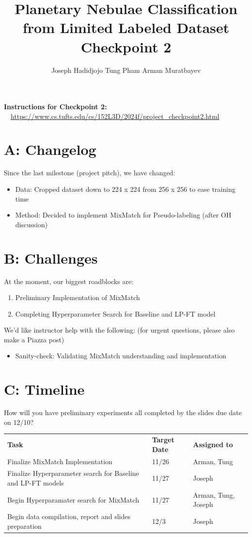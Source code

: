 \documentclass{article}
\title{Planetary Nebulae Classification from Limited Labeled Dataset \\ Checkpoint 2}
\author{Joseph Hadidjojo \And Tung Pham \And Arman Muratbayev}
\begin{document}
\maketitle

\textbf{Instructions for Checkpoint 2:} ~~\url{https://www.cs.tufts.edu/cs/152L3D/2024f/project_checkpoint2.html}


\section*{A: Changelog}

Since the last milestone (project pitch), we have changed:
\begin{itemize}
    \item Data: Cropped dataset down to 224 x 224 from 256 x 256 to ease training time
    \item Method: Decided to implement MixMatch for Pseudo-labeling (after OH discussion)
\end{itemize}

\section*{B: Challenges}
At the moment, our biggest roadblocks are:
\begin{enumerate}
    \item Preliminary Implementation of MixMatch
    \item Completing Hyperparameter Search for Baseline and LP-FT model
\end{enumerate}

We'd like instructor help with the following: (for urgent questions, please also make a Piazza post)
\begin{itemize}
    \item Sanity-check: Validating MixMatch understanding and implementation
\end{itemize}

\section*{C: Timeline}

How will you have preliminary experiments all completed by the slides due date on 12/10?

\begin{table}[!h]
    \begin{tabular}{p{10cm} p{1cm} p{2cm}}
    \textbf{Task} & 
    \textbf{Target Date} & 
    \textbf{Assigned to}
    \\
    Finalize MixMatch Implementation& 11/26 & Arman, Tung
    \\
    Finalize Hyperparameter search for Baseline and LP-FT models & 11/27 & Joseph
    \\
    Begin Hyperparamater search for MixMatch & 11/27 & Arman, Tung, Joseph
    \\
    Begin data compilation, report and slides preparation & 12/3 & Joseph
    \end{tabular}
\end{table}
\end{document}
